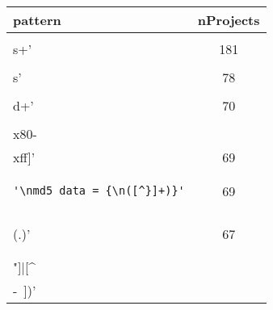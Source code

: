 \begin{table*}
\begin{center}
\begin{tabular}{lc}
\toprule
pattern & nProjects \\ 
\midrule
\begin{minipage}{2.3in}
\begin{verbatim}
'\\s+'\end{verbatim}
\end{minipage}
& 181 \\ 
\midrule
\begin{minipage}{2.3in}
\begin{verbatim}
'\\s'\end{verbatim}
\end{minipage}
& 78 \\ 
\midrule
\begin{minipage}{2.3in}
\begin{verbatim}
'\\d+'\end{verbatim}
\end{minipage}
& 70 \\ 
\midrule
\begin{minipage}{2.3in}
\begin{verbatim}
'[\\x80-\\xff]'\end{verbatim}
\end{minipage}
& 69 \\ 
\midrule
\begin{minipage}{2.3in}
\begin{verbatim}
'\nmd5_data = {\n([^}]+)}'\end{verbatim}
\end{minipage}
& 69 \\ 
\midrule
\begin{minipage}{2.3in}
\begin{verbatim}
'\\\\(.)'\end{verbatim}
\end{minipage}
& 67 \\ 
\midrule
\begin{minipage}{2.3in}
\begin{verbatim}
'([\\\\"]|[^\\ -~])'\end{verbatim}

\end{minipage}
\end{tabular}
\end{center}
\end{table*}
